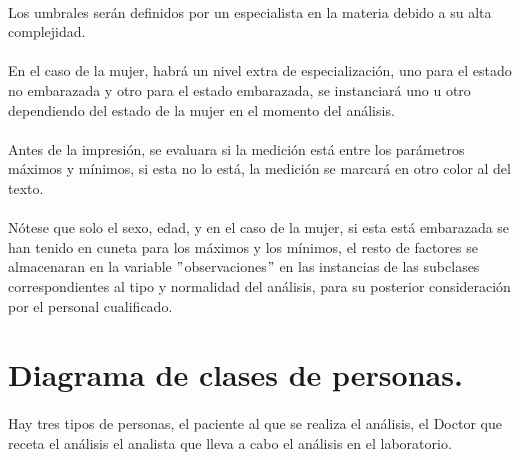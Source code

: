 \documentclass[a4paper,10pt]{article}
\begin{document}
\paragraph{}
Los umbrales serán definidos por un especialista en la materia debido a su alta complejidad.
\paragraph{}
En el caso de la mujer, habrá un nivel extra de especialización, uno para el estado no embarazada y otro para el estado embarazada, se instanciará uno u otro dependiendo del estado de la mujer en el momento del análisis.
\paragraph{}
Antes de la impresión, se evaluara si la medición está entre los parámetros máximos y mínimos, si esta no lo está, la medición se marcará en otro color al del texto.
\paragraph{}
Nótese que solo el sexo, edad, y en el caso de la mujer, si esta está embarazada se han tenido en cuneta para los máximos y los mínimos, el resto de factores se almacenaran en la variable $"$observaciones$"$ en las instancias de las subclases correspondientes al tipo y normalidad del análisis, para su posterior consideración por el personal cualificado.
\pagebreak

\section{Diagrama de clases de personas.}
\paragraph{}
Hay tres tipos de personas, el paciente al que se realiza el análisis, el Doctor que receta el análisis el analista que lleva a cabo el análisis en el laboratorio.
\end{document}
